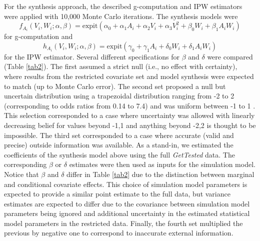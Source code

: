 \documentclass[]{article}
\begin{document}
For the synthesis approach, the described g-computation and IPW estimators were applied with 10,000 Monte Carlo iterations. The synthesis models were 
\[f_{A_i}(V_i, W_i; \alpha, \beta) = \text{expit}(\alpha_0 + \alpha_1 A_i + \alpha_2 V_i + \alpha_3 V_i^2 + \beta_0 W_i + \beta_1 A_i W_i)\]
for g-computation and 
\[h_{A_i}(V_i, W_i; \alpha, \beta) = \text{expit}(\gamma_0 + \gamma_1 A_i + \delta_0 W_i + \delta_1 A_i W_i)\]
for the IPW estimator. Several different specifications for $\beta$ and $\delta$ were compared (Table \ref{tab2}). The first assumed a strict null (i.e., no effect with certainty), where results from the restricted covariate set and model synthesis were expected to match (up to Monte Carlo error). The second set proposed a null but uncertain distribution using a trapezoidal distribution ranging from -2 to 2 (corresponding to odds ratios from 0.14 to 7.4) and was uniform between -1 to 1 \cite{fox_method_2005}. This selection corresponded to a case where uncertainty was allowed with linearly decreasing belief for values beyond -1,1 and anything beyond -2,2 is thought to be impossible. The third set corresponded to a case where accurate (valid and precise) outside information was available. As a stand-in, we estimated the coefficients of the synthesis model above using the full \textit{GetTested} data. The corresponding $\beta$ or $\delta$ estimates were then used as inputs for the simulation model. Notice that $\beta$ and $\delta$ differ in Table \ref{tab2} due to the distinction between marginal and conditional covariate effects. This choice of simulation model parameters is expected to provide a similar point estimate to the full data, but variance estimates are expected to differ due to the covariance between simulation model parameters being ignored and additional uncertainty in the estimated statistical model parameters in the restricted data. Finally, the fourth set multiplied the previous by negative one to correspond to inaccurate external information.
\end{document}

